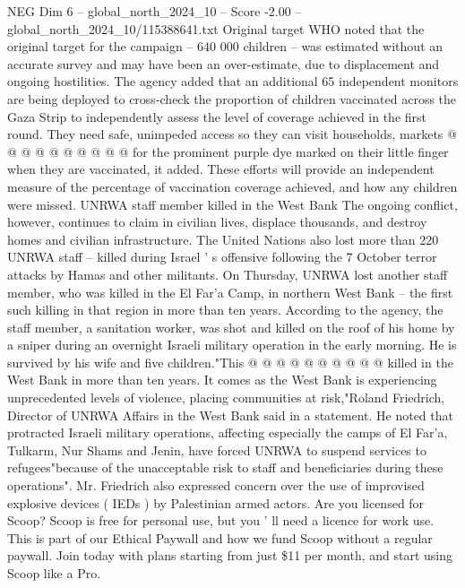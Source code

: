 \begin{textsample}{NEG Dim 6 – global\_north\_2024\_10 – Score -2.00 – global\_north\_2024\_10/115388641.txt}
Original target WHO noted that the original target for the campaign -- 640 000 children -- was estimated without an accurate survey and may have been an over-estimate, due to displacement and ongoing hostilities.
The agency added that an additional 65 independent monitors are being deployed to cross-check the proportion of children vaccinated across the Gaza Strip to independently assess the level of coverage achieved in the first round.
They need safe, unimpeded access so they can visit households, markets @ @ @ @ @ @ @ @ @ @ for the prominent purple dye marked on their little finger when they are vaccinated, it added.
These efforts will provide an independent measure of the percentage of vaccination coverage achieved, and how any children were missed.
UNRWA staff member killed in the West Bank The ongoing conflict, however, continues to claim in civilian lives, displace thousands, and destroy homes and civilian infrastructure.
The United Nations also lost more than 220 UNRWA staff -- killed during Israel ' s offensive following the 7 October terror attacks by Hamas and other militants.
On Thursday, UNRWA lost another staff member, who was killed in the El Far'a Camp, in northern West Bank -- the first such killing in that region in more than ten years.
According to the agency, the staff member, a sanitation worker, was shot and killed on the roof of his home by a sniper during an overnight Israeli military operation in the early morning.
He is survived by his wife and five children."This @ @ @ @ @ @ @ @ @ @ killed in the West Bank in more than ten years.
It comes as the West Bank is experiencing unprecedented levels of violence, placing communities at risk,"Roland Friedrich, Director of UNRWA Affairs in the West Bank said in a statement.
He noted that protracted Israeli military operations, affecting especially the camps of El Far'a, Tulkarm, Nur Shams and Jenin, have forced UNRWA to suspend services to refugees"because of the unacceptable risk to staff and beneficiaries during these operations".
Mr.
Friedrich also expressed concern over the use of improvised explosive devices ( IEDs ) by Palestinian armed actors.
Are you licensed for Scoop?
Scoop is free for personal use, but you ' ll need a licence for work use.
This is part of our Ethical Paywall and how we fund Scoop without a regular paywall.
Join today with plans starting from just \$11 per month, and start using Scoop like a Pro.

\end{textsample}
